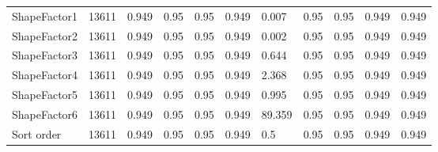 \documentclass[10pt, conference]{IEEEtran}
\begin{document}
\begin{center}
\begin{tabular}{ |p{2.5cm}||p{1.32cm}|p{1.32cm}|p{1.32cm}|p{1.32cm}|p{1.32cm}|p{1.32cm}|p{1.32cm}|p{1.32cm}|p{1.32cm}|p{1.32cm}| }
        ShapeFactor1        &13611  &0.949  &0.95   &0.95   &0.949  &0.007  &0.95   &0.95   &0.949  &0.949\\
        ShapeFactor2        &13611  &0.949  &0.95   &0.95   &0.949  &0.002  &0.95   &0.95   &0.949  &0.949\\
        ShapeFactor3        &13611  &0.949  &0.95   &0.95   &0.949  &0.644  &0.95   &0.95   &0.949  &0.949\\
        ShapeFactor4        &13611  &0.949  &0.95   &0.95   &0.949  &2.368  &0.95   &0.95   &0.949  &0.949\\
        ShapeFactor5        &13611  &0.949  &0.95   &0.95   &0.949  &0.995  &0.95   &0.95   &0.949  &0.949\\
        ShapeFactor6        &13611  &0.949  &0.95   &0.95   &0.949  &89.359  &0.95   &0.95   &0.949  &0.949\\
        Sort order          &13611  &0.949  &0.95   &0.95   &0.949  &0.5  &0.95   &0.95   &0.949  &0.949\\

        \hline
    \end{tabular}
\end{center}
\end{document}
